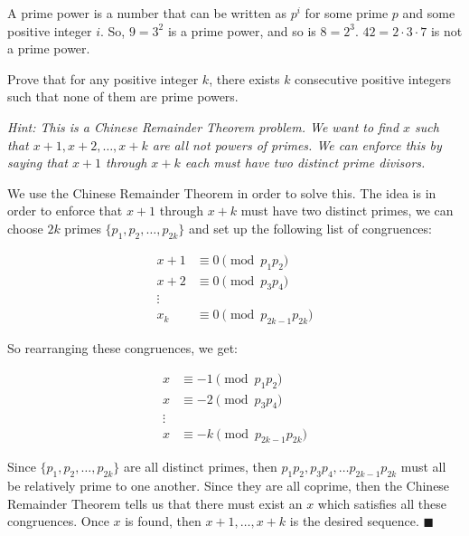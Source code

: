 \documentclass[11pt]{article}
\begin{document}
\pagebreak
{}

A prime power is a number that can be written as $p^i$ for some prime $p$ and some
positive integer $i$. So, $9 = 3^2$ is a prime power, and so is $8 = 2^3$. $42 = 2 \cdot 3 \cdot 7$ is not
a prime power.

Prove that for any positive integer $k$, there exists $k$ consecutive positive integers
such that none of them are prime powers.

\emph{Hint: This is a Chinese Remainder Theorem problem. We want to find $x$ such that $x + 1, x + 2, \ldots, x+k$ are all not powers of primes. We can enforce this by saying that $x+1$ through $x+k$ each must have two distinct prime divisors.}


\begin{solution}
  We use the Chinese Remainder Theorem in order to solve this. The idea is in order to enforce that $x+1$ through $x+k$ must have two distinct primes, we can choose $2k$ primes $\{p_1, p_2, \dots, p_{2k}\}$ and set up the following list of congruences: 

  \begin{align*}
    x+1 &\equiv 0 \pmod{p_1p_2}\\
    x+2 &\equiv 0 \pmod{p_3p_4}\\
    \vdots\\
    x_k &\equiv 0 \pmod{p_{2k - 1}p_{2k}}
  \end{align*}

  So rearranging these congruences, we get: 

  \begin{align*}
    x &\equiv -1 \pmod{p_1p_2}\\
    x &\equiv -2 \pmod{p_3p_4}\\
    \vdots\\
    x &\equiv -k \pmod{p_{2k - 1}p_{2k}}
  \end{align*} 

  Since $\{p_1, p_2, \dots, p_{2k}\}$ are all distinct primes, then $p_1p_2, p_3p_4, \dots p_{2k-1}p_{2k}$ must all be relatively prime to one another. Since they are all coprime, then the Chinese Remainder Theorem tells us that there must exist an $x$ which satisfies all these congruences. Once $x$ is found, then $x+1, \dots, x+k$ is the desired sequence. $\blacksquare$

  


\end{solution}
\end{document}
